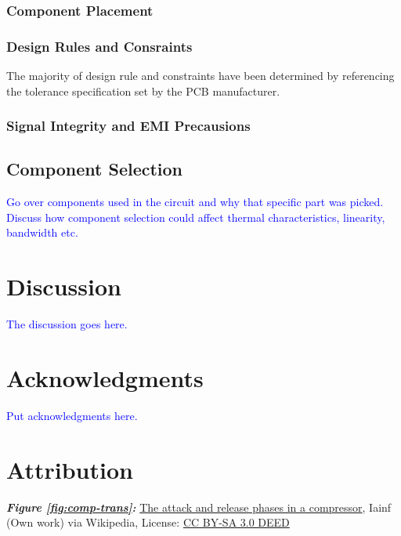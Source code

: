 \documentclass[10pt]{article}
\begin{document}
\begin{multicols*}{2}
                \subsubsection{Component Placement}

                \subsubsection{Design Rules and Consraints}
                    The majority of design rule and constraints have been determined by referencing the tolerance specification set by the PCB manufacturer. 

                \subsubsection{Signal Integrity and EMI Precausions}

            \subsection{Component Selection}
                \textcolor{blue}{Go over components used in the circuit and why that specific part was picked. Discuss how component selection could affect thermal characteristics, linearity, bandwidth etc.}
        
        \section{Discussion}
            \textcolor{blue}{The discussion goes here.}

        \section*{Acknowledgments}
            \textcolor{blue}{Put acknowledgments here. }

        \section*{Attribution}
            \footnotesize{
                \textit{\textbf{Figure \ref{fig:comp-trans}:}} \href{https://en.wikipedia.org/wiki/Dynamic_range_compression#/media/File:Audio_Compression_Attack_and_Release-2.svg}{The attack and release phases in a compressor}, Iainf (Own work) via Wikipedia, License: \href{https://creativecommons.org/licenses/by-sa/3.0/}{CC BY-SA 3.0 DEED}\\

}
\end{multicols*}
\end{document}
